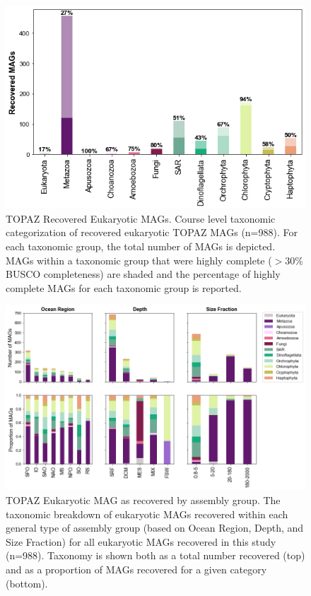 \documentclass[12pt]{article}
\numberwithin{equation}{section}
\begin{document}
\begin{figure}
    \centering
    \includegraphics[width=0.9\columnwidth]{si-figures/MAGS_recovered.png}
    \caption{TOPAZ Recovered Eukaryotic MAGs. Course level taxonomic categorization of recovered eukaryotic TOPAZ MAGs (n=988). For each taxonomic group, the total number of MAGs is depicted. MAGs within a taxonomic group that were highly complete ($>30\%$ BUSCO completeness) are shaded and the percentage of highly complete MAGs for each taxonomic group is reported. }
    \label{fig:recovered}
\end{figure}

\begin{landscape}
\begin{figure}
    \centering
    \includegraphics[width=0.95\columnwidth]{si-figures/ALL_MAG_distributions.png}
    \caption{TOPAZ Eukaryotic MAG as recovered by assembly group. The taxonomic breakdown of eukaryotic MAGs recovered within each general type of assembly group (based on Ocean Region, Depth, and Size Fraction) for all eukaryotic MAGs recovered in this study (n=988). Taxonomy is shown both as a total number recovered (top) and as a proportion of MAGs recovered for a given category (bottom). }
    \label{fig:all-dist}
\end{figure}
\end{landscape}
\end{document}
